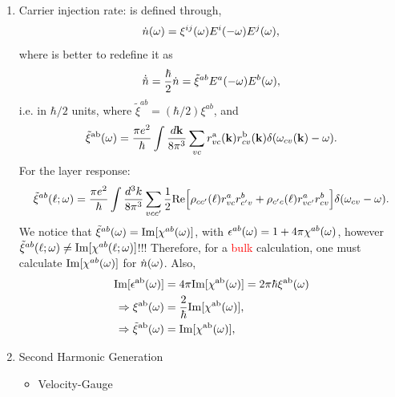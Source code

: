 \documentclass[12pt]{article}
\numberwithin{equation}{section}
\begin{document}
\begin{enumerate}
\item Carrier injection rate: is defined through,
\begin{align}\label{cir.0}
\dot n(\omega)=\xi^{ij}(\omega)E^i(-\omega)E^j(\omega)  
,
\end{align} 
where is better to redefine it as 
\begin{align}\label{cir.1}
\dot{\tilde n}=
\frac{\hbar}{2}\dot 
n=\tilde\xi^{ab}E^a(-\omega)E^b(\omega)
,
\end{align}
i.e. in $\hbar/2$ units, where
$\tilde\xi^{ab}=(\hbar/2)
\xi^{ab}$, and
\begin{equation}\label{chifp}
\tilde\xi^{\mathrm{a}\mathrm{b}}(\omega)=\frac{\pi e^2}{\hbar}
\int \frac{d\mathbf{k}}{8\pi^3}
\sum_{vc}
r^{\mathrm{a}}_{vc}(\mathbf{k})r^{\mathrm{b}}_{cv}(\mathbf{k})\delta(\omega_{cv}(\mathbf{k})-\omega)
.
\end{equation} 
For the layer response:
\begin{equation*}\label{xizn}
\tilde\xi^{ab}(\ell;\omega)
=
\frac{\pi e^2}{\hbar}
\int\frac{d^3k}{8\pi^3}
\sum_{vcc'}
\frac{1}{2}\mathrm{Re}\Big[
\rho_{cc'}(\ell)    
r^a_{vc} 
r^b_{c'v}
+
\rho_{c'c}(\ell) 
r^a_{vc'} 
r^b_{cv}
\Big]
\delta(\omega_{cv}-\omega)
.
\end{equation*}
We notice that $\tilde\xi^{ab}(\omega)=\mathrm{Im}[\chi^{ab}(\omega)]$, with
$\epsilon^{ab}(\omega)=1+4\pi\chi^{ab}(\omega)$, however 
$\tilde\xi^{ab}(\ell;\omega)\neq\mathrm{Im}[\chi^{ab}(\ell;\omega)]$!!!
Therefore, for a \textcolor{red}{bulk} calculation, one must calculate
$\mathrm{Im}[\chi^{ab}(\omega)]$ for $\dot n(\omega)$.
Also,
\begin{align}\label{nn.11}
\mathrm{Im}[\epsilon^{\mathrm{a}\mathrm{b}}(\omega)]
&=
4\pi\mathrm{Im}[\chi^{\mathrm{a}\mathrm{b}}(\omega)]
=
2\pi\hbar\xi^{\mathrm{a}\mathrm{b}}(\omega)
\nonumber\\
\Rightarrow 
\xi^{\mathrm{a}\mathrm{b}}(\omega) 
&=
\frac{2}{\hbar}\mathrm{Im}[\chi^{\mathrm{a}\mathrm{b}}(\omega)],
\nonumber\\
\Rightarrow 
\tilde\xi^{\mathrm{a}\mathrm{b}}(\omega) 
&=
\mathrm{Im}[\chi^{\mathrm{a}\mathrm{b}}(\omega)],
\end{align}


\item Second Harmonic Generation
\begin{itemize}
\item Velocity-Gauge 


\end{itemize}
\end{enumerate}
\end{document}

